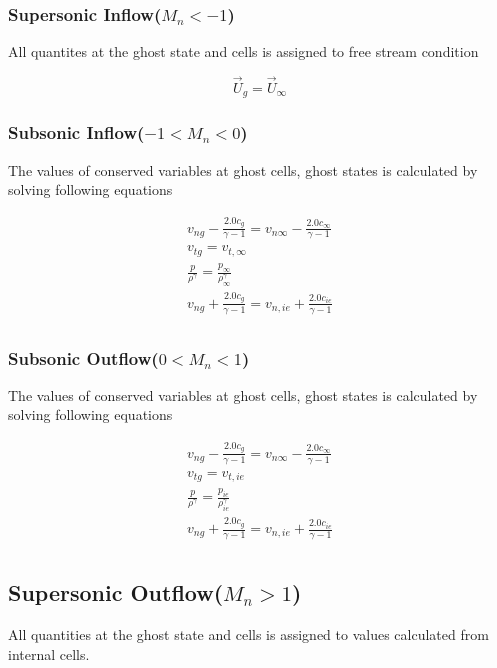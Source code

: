 \documentclass[12pt]{elsarticle}
\begin{document}
	\subsubsection{Supersonic Inflow($M_n<-1$)}
	All quantites at the ghost state and cells is assigned to free stream condition
	
	\begin{equation}
		\overrightarrow{U}_g=\overrightarrow{U}_{\infty}
	\end{equation}
	
	\subsubsection{Subsonic Inflow($-1<M_n<0$)}
	The values of conserved variables at ghost cells, ghost states is calculated by solving following equations
	
	\begin{equation}
		\begin{gathered}
			v_{ng}-\frac{2.0 c_g}{\gamma-1}=v_{n \infty}-\frac{2.0 c_{\infty}}{\gamma-1}\\
			v_{tg}=v_{t,\infty}\\
			\frac{p}{\rho^\gamma}=\frac{p_{\infty}}{\rho_{\infty}^{\gamma}}\\
			v_{ng}+\frac{2.0 c_g}{\gamma-1}=v_{n,ie}+\frac{2.0 c_{ie}}{\gamma-1}\\
		\end{gathered}
	\end{equation}
	
	\subsubsection{Subsonic Outflow($0<M_n<1$)}
	The values of conserved variables at ghost cells, ghost states is calculated by solving following equations
	
	\begin{equation}
		\begin{gathered}
			v_{ng}-\frac{2.0 c_g}{\gamma-1}=v_{n \infty}-\frac{2.0 c_{\infty}}{\gamma-1}\\
			v_{tg}=v_{t,ie}\\
			\frac{p}{\rho^\gamma}=\frac{p_{ie}}{\rho_{ie}^{\gamma}}\\
			v_{ng}+\frac{2.0 c_g}{\gamma-1}=v_{n,ie}+\frac{2.0 c_{ie}}{\gamma-1}\\
		\end{gathered}
	\end{equation}
	\subsection{Supersonic Outflow($M_n>1$)}
	All quantities at the ghost state and cells is assigned to values calculated from internal cells.
	
\end{document}
